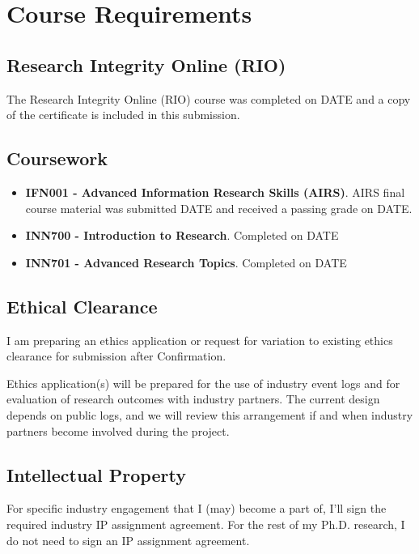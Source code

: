 
\chapter{Course Requirements}

\section{Research Integrity Online (RIO)}

The Research Integrity Online (RIO) course was completed on DATE and a copy of the certificate is included in this submission.

\section{Coursework}

\begin{itemize}
\item \textbf{IFN001 - Advanced Information Research Skills (AIRS)}. AIRS final course material was submitted DATE and received a passing grade on DATE.

\item \textbf{INN700 - Introduction to Research}. Completed on DATE

\item \textbf{INN701 - Advanced Research Topics}. Completed on DATE
\end{itemize}

\section{Ethical Clearance}

I am preparing an ethics application or request for variation to existing ethics clearance for submission after Confirmation.

Ethics application(s) will be prepared for the use of industry event logs and for evaluation of research outcomes with industry partners. The current design depends on public logs, and we will review this arrangement if and when industry partners become involved during the project.


\section{Intellectual Property}

For specific industry engagement that I (may) become a part of, I’ll sign the required industry IP assignment agreement. For the rest of my Ph.D. research, I do not need to sign an IP assignment agreement. 

